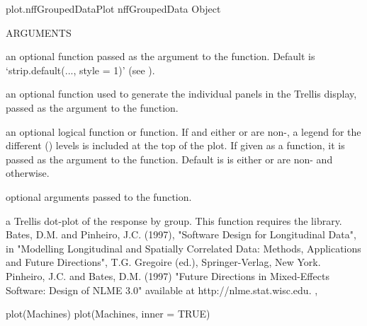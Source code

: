 \documentclass[pdftex]{article} \usepackage{url,graphicx}
\begin{document}
\begin{Helpfile}{plot.nffGroupedData}{Plot nffGroupedData Object}
\begin{Argument}{ARGUMENTS}
\item[\Co{strip:}]
an optional function passed as the  argument to
the  function. Default is `strip.default(..., style
     = 1)' (see ).
\item[\Co{panel:}]
an optional function used to generate the individual
panels in the Trellis display, passed as the  argument
to the  function.
\item[\Co{key:}]
an optional logical function or function. If 
and either  or  are non-, a
legend for the different  () levels is 
included at the top of the plot. If given as a function, it is passed
as the  argument to the  function. Default is
 is either  or  are
non- and  otherwise.
\item[\Co{...:}]
optional arguments passed to the  function.
\end{Argument}
a Trellis dot-plot of the response by group.
 This function requires the  library.
Bates, D.M. and Pinheiro, J.C. (1997), "Software Design for Longitudinal
Data", in "Modelling Longitudinal and Spatially Correlated Data:
Methods, Applications and Future Directions", T.G. Gregoire (ed.),
Springer-Verlag, New York.
Pinheiro, J.C. and Bates, D.M. (1997) "Future Directions in
Mixed-Effects Software: Design of NLME 3.0" available at
http://nlme.stat.wisc.edu.
, 
\need 15pt
\vspace{-16pt} 
\begin{Example}
plot(Machines)
plot(Machines, inner = TRUE)
\end{Example}
\end{Helpfile}
\end{document}
